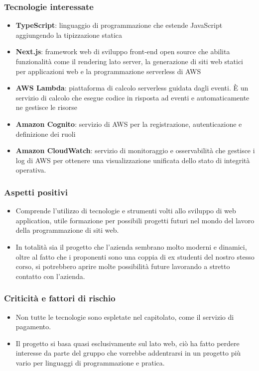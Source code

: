 		\subsubsection{Tecnologie interessate}
			\begin{itemize}
				\item\textbf{TypeScript}:  linguaggio di programmazione che estende JavaScript aggiungendo la tipizzazione statica
				\item\textbf{Next.js}:  framework web di sviluppo front-end open source che abilita funzionalità come il rendering lato server, la generazione di siti web statici per applicazioni web e la programmazione serverless di AWS
				\item\textbf{AWS Lambda}: piattaforma di calcolo serverless guidata dagli eventi. È un servizio di calcolo che esegue codice in risposta ad eventi e automaticamente ne gestisce le risorse
				\item\textbf{Amazon Cognito}: servizio di AWS per la registrazione, autenticazione e definizione dei ruoli
				\item\textbf{Amazon CloudWatch}: servizio di monitoraggio e osservabilità che gestisce i log di AWS per ottenere una visualizzazione unificata dello stato di integrità operativa.
			\end{itemize}
			
		\subsubsection{Aspetti positivi}
			\begin{itemize}
				\item Comprende l’utilizzo di tecnologie e strumenti volti allo sviluppo di web application, utile formazione per possibili progetti futuri nel mondo del lavoro della programmazione di siti web.
				\item In totalità sia il progetto che l’azienda sembrano molto moderni e dinamici, oltre al fatto che i proponenti sono una coppia di ex studenti del nostro stesso corso, si potrebbero aprire molte possibilità future lavorando a stretto contatto con l’azienda.
			\end{itemize}
			
		\subsubsection{Criticità e fattori di rischio}
			\begin{itemize}
				\item Non tutte le tecnologie sono espletate nel capitolato, come il servizio di pagamento.
				\item Il progetto si basa quasi esclusivamente sul lato web, ciò ha fatto perdere interesse da parte del gruppo che vorrebbe addentrarsi in un progetto più vario per linguaggi di programmazione e pratica.
			\end{itemize}
